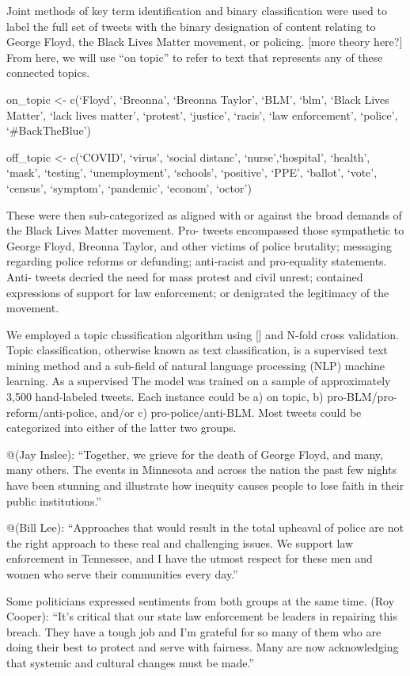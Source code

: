 \documentclass[12pt]{article}
\begin{document}
Joint methods of key term identification and binary classification were
used to label the full set of tweets with the binary designation of
content relating to George Floyd, the Black Lives Matter movement, or
policing. {[}more theory here?{]} From here, we will use ``on topic'' to
refer to text that represents any of these connected topics.

on\_topic \textless- c(`Floyd', `Breonna', `Breonna Taylor', `BLM',
`blm', `Black Lives Matter', `lack lives matter', `protest', `justice',
`racis', `law enforcement', `police', `\#BackTheBlue')

off\_topic \textless- c(`COVID', `virus', `social distanc',
`nurse',`hospital', `health', `mask', `testing', `unemployment',
`schools', `positive', `PPE', `ballot', `vote', `census', `symptom',
`pandemic', `econom', `octor')

These were then sub-categorized as aligned with or against the broad
demands of the Black Lives Matter movement. Pro- tweets encompassed
those sympathetic to George Floyd, Breonna Taylor, and other victims of
police brutality; messaging regarding police reforms or defunding;
anti-racist and pro-equality statements. Anti- tweets decried the need
for mass protest and civil unrest; contained expressions of support for
law enforcement; or denigrated the legitimacy of the movement.

We employed a topic classification algorithm using {[}{]} and N-fold
cross validation. Topic classification, otherwise known as text
classification, is a supervised text mining method and a sub-field of
natural language processing (NLP) machine learning. As a supervised The
model was trained on a sample of approximately 3,500 hand-labeled
tweets. Each instance could be a) on topic, b)
pro-BLM/pro-reform/anti-police, and/or c) pro-police/anti-BLM. Most
tweets could be categorized into either of the latter two groups.

@(Jay Inslee): ``Together, we grieve for the death of George Floyd, and
many, many others. The events in Minnesota and across the nation the
past few nights have been stunning and illustrate how inequity causes
people to lose faith in their public institutions.''

@(Bill Lee): ``Approaches that would result in the total upheaval of
police are not the right approach to these real and challenging issues.
We support law enforcement in Tennessee, and I have the utmost respect
for these men and women who serve their communities every day.''

Some politicians expressed sentiments from both groups at the same time.
\citet{NC_Governor} (Roy Cooper): ``It's critical that our state law
enforcement be leaders in repairing this breach. They have a tough job
and I'm grateful for so many of them who are doing their best to protect
and serve with fairness. Many are now acknowledging that systemic and
cultural changes must be made.''
\end{document}

